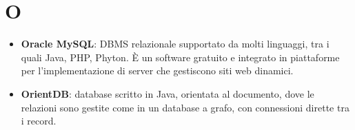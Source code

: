 \newpage
\section{O}

\begin{itemize}
	\item \textbf{Oracle MySQL}: DBMS relazionale supportato da molti linguaggi, tra i quali Java, PHP, Phyton. \MakeUppercase{è} un software gratuito e integrato in piattaforme per l'implementazione di server che gestiscono siti web dinamici.
	\item \textbf{OrientDB}: database scritto in Java, orientata al documento, dove le relazioni sono gestite come in un database a grafo, con connessioni dirette tra i record.
\end{itemize}


